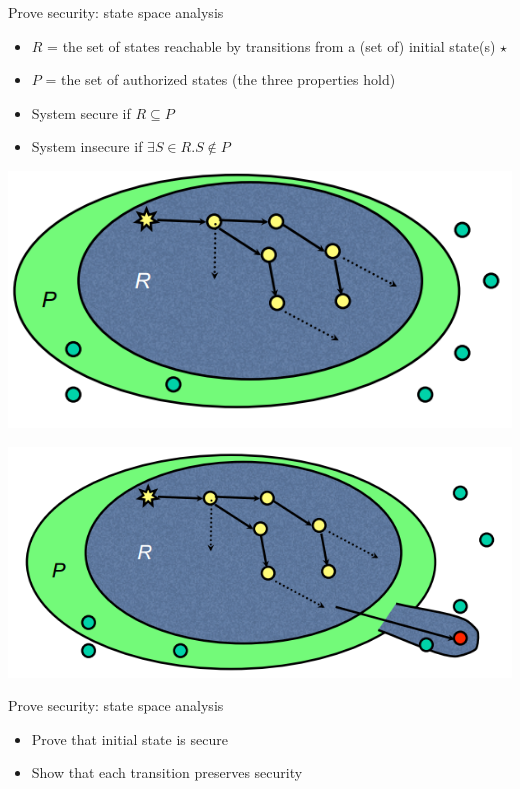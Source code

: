 \documentclass{beamer}
\begin{document}
\begin{frame}{Prove security: state space analysis}
  \begin{itemize}
  \item $R$ = the set of states reachable by transitions from a
    (set of) initial state(s) $\star$
  \item $P$ = the set of authorized states (the three properties hold)
  \item System secure if $R \subseteq P$
  \item System insecure if $\exists S \in R. S \not \in P$
  \end{itemize}
   {
  \begin{center}
    \includegraphics[width=0.5\linewidth]{secure_system}
  \end{center}}
   {
  \begin{center}
    \includegraphics[width=0.5\linewidth]{insicure_system}
  \end{center}}
\end{frame}

\begin{frame}{Prove security: state space analysis}
  \begin{itemize}
  \item Prove that initial state is secure 
  \item Show that each transition preserves security
  \end{itemize}
\end{frame}

\end{document}
